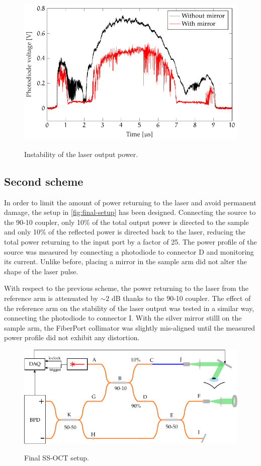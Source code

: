 \begin{figure}[bth]
	\myfloatalign
	{\includegraphics[width=0.8\linewidth]{gfx/ch3/first-scheme-instability}}
	\caption{Instability of the laser output power.}\label{fig:first-scheme-instability}
\end{figure}




\subsection{Second scheme}
In order to limit the amount of power returning to the laser and avoid permanent damage, the setup in \autoref{fig:final-setup} has been designed. Connecting the source to the 90-10 coupler, only 10\% of the total output power is directed to the sample and only 10\% of the reflected power is directed back to the laser, reducing the total power returning to the input port by a factor of 25. The power profile of the source was measured by connecting a photodiode to connector D and monitoring its current. Unlike before, placing a mirror in the sample arm did not alter the shape of the laser pulse. 

With respect to the previous scheme, the power returning to the laser from the reference arm is attenuated by $\sim 2$ dB thanks to the 90-10 coupler. 
The effect of the reference arm on the stability of the laser output was tested in a similar way, connecting the photodiode to connector I. With the silver mirror stilll on the sample arm, the FiberPort collimator was slightly mis-aligned until the measured power profile did not exhibit any distortion. 

\begin{figure}[bth]
	\myfloatalign
	{\includegraphics[width=\linewidth]{gfx/setup-diagrams/final-setup-2.pdf}}
	\caption{Final SS-OCT setup.}\label{fig:final-setup}
\end{figure}

